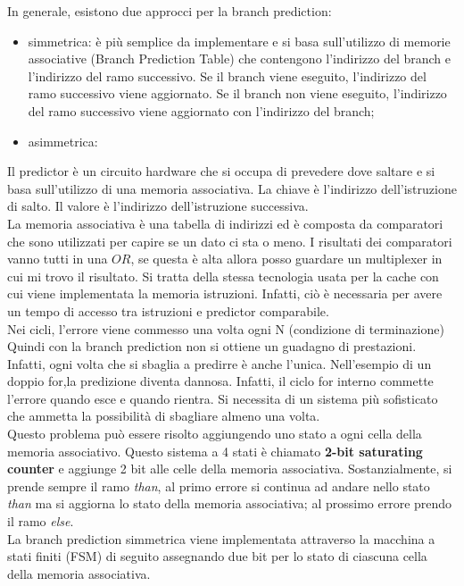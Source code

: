 \documentclass{article}
\begin{document}
In generale, esistono due approcci per la branch prediction:
\begin{itemize}
  \item simmetrica: è più semplice da implementare e si basa sull'utilizzo di 
    memorie associative (Branch Prediction Table) che contengono l'indirizzo 
    del branch e l'indirizzo del ramo successivo. Se il branch viene eseguito, 
    l'indirizzo del ramo successivo viene aggiornato. Se il branch non viene 
    eseguito, l'indirizzo del ramo successivo viene aggiornato con l'indirizzo 
    del branch;
  \item asimmetrica:
\end{itemize}

Il predictor è un circuito hardware che si occupa di prevedere dove saltare e 
si basa sull'utilizzo di una memoria associativa. La chiave è l'indirizzo
dell'istruzione di salto. Il valore è l'indirizzo dell'istruzione successiva.\\ 

La memoria associativa è una tabella di indirizzi ed è composta da comparatori
che  sono utilizzati per capire se un dato ci sta o meno. I risultati dei 
comparatori vanno tutti in una $OR$, se questa è alta allora posso guardare
un multiplexer in  cui mi trovo il risultato. Si tratta della stessa tecnologia
usata per la cache con cui viene implementata la memoria istruzioni.
Infatti, ciò è necessaria per avere un tempo di accesso tra istruzioni e
predictor comparabile.\\
Nei cicli, l'errore viene commesso una volta ogni N (condizione di terminazione)
Quindi con la branch prediction non si ottiene un guadagno di prestazioni. 
Infatti, ogni volta che si sbaglia a predirre è anche l'unica. 
Nell'esempio di un doppio for,la predizione diventa dannosa. Infatti, il ciclo
for interno commette l'errore quando esce e quando rientra. Si necessita di un 
sistema più sofisticato che ammetta la possibilità di sbagliare almeno una 
volta.\\ 
Questo problema può essere risolto aggiungendo uno stato a ogni cella della
memoria associativo. Questo sistema a 4 stati è chiamato 
\textbf{2-bit saturating counter} e aggiunge 2 bit alle celle della memoria
associativa. Sostanzialmente, si prende sempre il ramo \textit{than}, al 
primo errore si continua ad andare nello stato \textit{than} ma si aggiorna
lo stato della memoria associativa; al prossimo errore prendo il ramo 
\textit{else}.\\


La branch prediction simmetrica viene implementata attraverso la macchina a 
stati finiti (FSM) di seguito assegnando due bit per lo stato di ciascuna cella 
della memoria associativa.\\
\end{document}
